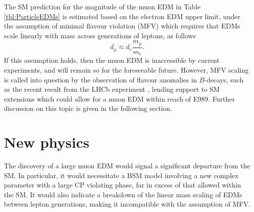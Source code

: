 The SM prediction for the magnitude of the muon EDM in Table \ref{tbl:ParticleEDMs} is estimated based on the electron EDM upper limit, under the assumption of minimal flavour violation (MFV) \cite{MFV} which requires that EDMs scale linearly with mass across generations of leptons, as follows
%
\begin{equation}
  d_{\mu} \approx d_{e}\frac{m_{\mu}}{m_{e}}.
  \label{eqn:EDMMassScaling}
\end{equation}
%
If this assumption holds, then the muon EDM is inaccessible by current experiments, and will remain so for the foreseeable future. However, MFV scaling is called into question by the observation of flavour anomalies in $B$-decays, such as the recent result from the LHCb experiment \cite{LHCb2021}, lending support to SM extensions which could allow for a muon EDM within reach of E989. Further discussion on this topic is given in the following section. 



\section{New physics}\label{sec:NewPhysics}


The discovery of a large muon EDM would signal a significant departure from the SM. In particular, it would necessitate a BSM model involving a new complex parameter with a large CP violating phase, far in excess of that allowed within the SM. It would also indicate a breakdown of the linear mass scaling of EDMs between lepton generations, making it incompatible with the assumption of MFV. 

